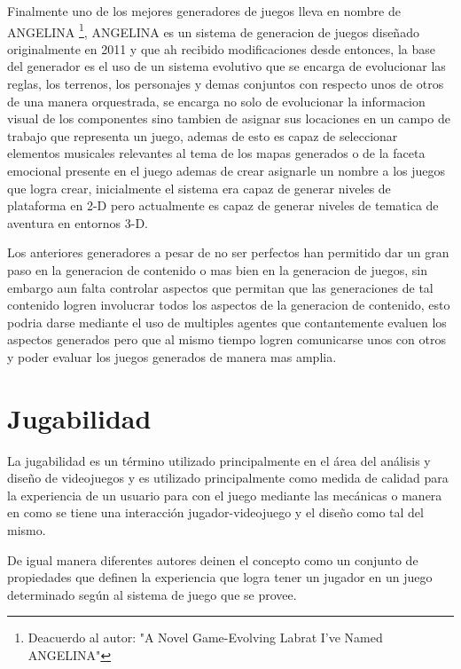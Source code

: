 Finalmente uno de los mejores generadores de juegos lleva en nombre de ANGELINA \cite{cook2011multi} %
\footnote{Deacuerdo al autor: "A Novel Game-Evolving Labrat I've Named
ANGELINA"}, ANGELINA es un sistema de generacion de juegos diseñado
originalmente en 2011 y que ah recibido modificaciones desde entonces, la base
del generador es el uso de un sistema evolutivo que se encarga de evolucionar
las reglas, los terrenos, los personajes y demas conjuntos con respecto unos de
otros de una manera orquestrada, se encarga no solo de evolucionar la
informacion visual de los componentes sino tambien de asignar sus locaciones en
un campo de trabajo que representa un juego, ademas de esto es capaz de
seleccionar elementos musicales relevantes al tema de los mapas generados o de
la faceta emocional presente en el juego ademas de crear asignarle un nombre a
los juegos que logra crear, inicialmente el sistema era capaz de generar niveles
de plataforma en 2-D pero actualmente es capaz de generar niveles de tematica de
aventura en entornos 3-D.

Los anteriores generadores a pesar de no ser perfectos han permitido dar un gran
paso en la generacion de contenido o mas bien en la generacion de juegos, sin
embargo aun falta controlar aspectos que permitan que las generaciones de tal
contenido logren involucrar todos los aspectos de la generacion de contenido,
esto podria darse mediante el uso de multiples agentes que contantemente evaluen
los aspectos generados pero que al mismo tiempo logren comunicarse unos con
otros y poder evaluar los juegos generados de manera mas amplia.

\section{Jugabilidad}
\label{section:playability}

La jugabilidad es un término utilizado principalmente en el área del análisis y
diseño de videojuegos y es utilizado principalmente como medida de calidad para
la experiencia de un usuario para con el juego mediante las mecánicas o manera
en como se tiene una interacción jugador-videojuego y el diseño como tal del mismo.

De igual manera diferentes autores deinen el concepto como un conjunto de
propiedades que definen la experiencia que logra tener un jugador en un juego
determinado según al sistema de juego que se provee.

